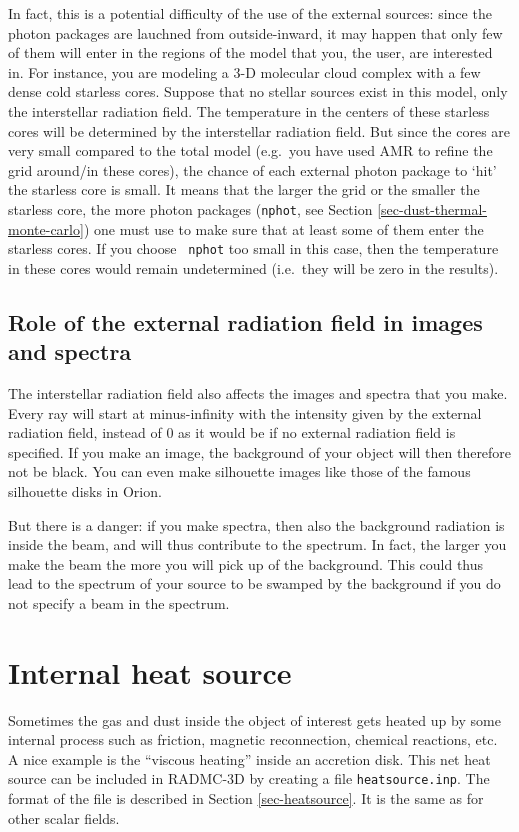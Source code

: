 \documentclass{report}
\begin{document}
In fact, this is a potential difficulty of the use of the external sources:
since the photon packages are lauchned from outside-inward, it may happen
that only few of them will enter in the regions of the model that you, the
user, are interested in. For instance, you are modeling a 3-D molecular
cloud complex with a few dense cold starless cores. Suppose that no stellar
sources exist in this model, only the interstellar radiation field. The
temperature in the centers of these starless cores will be determined by the
interstellar radiation field. But since the cores are very small compared to
the total model (e.g.\ you have used AMR to refine the grid around/in these
cores), the chance of each external photon package to `hit' the starless
core is small. It means that the larger the grid or the smaller the 
starless core, the more photon packages ({\small\tt nphot}, see
Section \ref{sec-dust-thermal-monte-carlo}) one must use to make sure that
at least some of them enter the starless cores. If you choose {\small\tt
nphot} too small in this case, then the temperature in these cores would
remain undetermined (i.e.\ they will be zero in the results).


\subsection{Role of the external radiation field in images and spectra}
The interstellar radiation field also affects the images and spectra that
you make. Every ray will start at minus-infinity with the intensity given by
the external radiation field, instead of 0 as it would be if no external
radiation field is specified. If you make an image, the background of your
object will then therefore not be black. You can even make silhouette images
like those of the famous silhouette disks in Orion. 

But there is a danger: if you make spectra, then also the background 
radiation is inside the beam, and will thus contribute to the spectrum.
In fact, the larger you make the beam the more you will pick up of the
background. This could thus lead to the spectrum of your source to be
swamped by the background if you do not specify a beam in the spectrum.


\section{Internal heat source}
\label{sec-internal-source}
%
Sometimes the gas and dust inside the object of interest gets heated up by
some internal process such as friction, magnetic reconnection, chemical
reactions, etc. A nice example is the ``viscous heating'' inside an
accretion disk. This net heat source can be included in RADMC-3D by creating
a file {\small\tt heatsource.inp}. The format of the file is described in
Section \ref{sec-heatsource}. It is the same as for other scalar fields.
\end{document}
